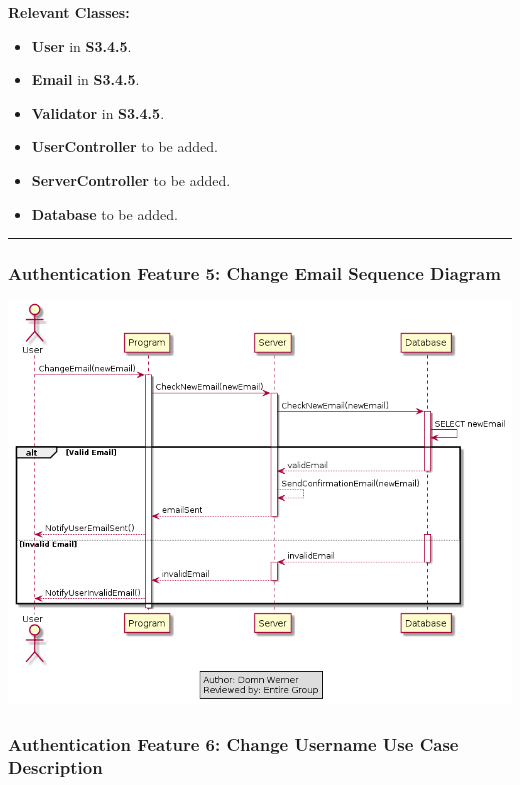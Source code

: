 \documentclass[twoside,letterpaper]{article}
\begin{document}
\noindent\textbf{Relevant Classes:}
\begin{itemize}
	\item \textbf{User} in \textbf{S3.4.5}.
	\item \textbf{Email} in \textbf{S3.4.5}.
	\item \textbf{Validator} in \textbf{S3.4.5}.
	\item \textbf{UserController} to be added.
	\item \textbf{ServerController} to be added.
	\item \textbf{Database} to be added.
\end{itemize}
\vspace{8pt}
\hrule
\newpage

\subsubsection[Authentication Feature 5: Change Email Sequence Diagram]{\rmfamily\bfseries\color{black}
	Authentication Feature 5: Change Email Sequence Diagram}
\hypertarget{RefHeading22059017292}{}

\bigskip

\includegraphics[width=\textwidth]{images/SequenceDiagrams/AuthenticationChangeEmail}

\newpage

\subsubsection[Authentication Feature 6: Change Username Use Case Description] {\rmfamily\bfseries\color{black}
	Authentication Feature 6: Change Username Use Case Description}
\hypertarget{RefHeading22059017292}{}
\end{document}
